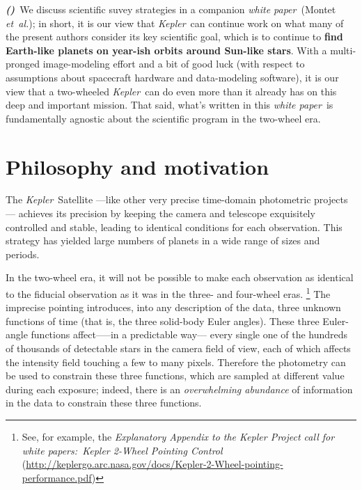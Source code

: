 \documentclass[letterpaper,12pt,whitepaper]{haastex}
\newcommand{\documentname}{\textsl{white paper}}
\newcommand{\foreign}[1]{\textit{#1}}
\newcommand{\etal}{\foreign{et~al.}}
\newcommand{\observatory}[1]{\textsl{#1}}
\newcommand{\Kepler}{\observatory{Kepler}}
\newcounter{inlineitem}
\newcommand{\binlineitem}{\refstepcounter{inlineitem}\textbf{\textsl{(\theinlineitem)}}}
\begin{document}
\binlineitem~We discuss scientific suvey strategies in a companion \documentname\ (Montet \etal);
  in short, it is our view that \Kepler\ can continue work on
  what many of the present authors consider its key scientific goal,
  which is to continue to \textbf{find Earth-like planets on year-ish orbits around Sun-like stars}.
With a multi-pronged image-modeling effort and
  a bit of good luck
  (with respect to assumptions about spacecraft hardware and data-modeling software),
  it is our view that a two-wheeled \Kepler\ can do even more
  than it already has on this deep and important mission.
That said, what's written in this \documentname\ is fundamentally
  agnostic about the scientific program in the two-wheel era.

\clearpage
\section{Philosophy and motivation}

The \Kepler\ Satellite%
  ---like other very precise time-domain photometric projects---%
  achieves its precision by keeping the camera and telescope exquisitely controlled and stable,
  leading to identical conditions for each observation.
This strategy has yielded large numbers of planets in a wide range of sizes and periods.

In the two-wheel era, it will not be possible
  to make each observation as identical to the fiducial observation
  as it was in the three- and four-wheel eras.%
  \footnote{See, for example, the \textit{Explanatory Appendix to the Kepler Project
      call for white papers:\ Kepler 2-Wheel Pointing Control}
    (\url{http://keplergo.arc.nasa.gov/docs/Kepler-2-Wheel-pointing-performance.pdf})}
The imprecise pointing introduces, into any description of the data, three unknown functions of time
  (that is, the three solid-body Euler angles).
These three Euler-angle functions affect—--in a predictable way---%
  every single one of the hundreds of thousands of detectable stars
  in the camera field of view,
  each of which affects the intensity field touching a few to many pixels.
Therefore the photometry can be used to constrain these three functions,
  which are sampled at different value during each exposure;
  indeed, there is an \emph{overwhelming abundance} of information in the data
  to constrain these three functions.
\end{document}
